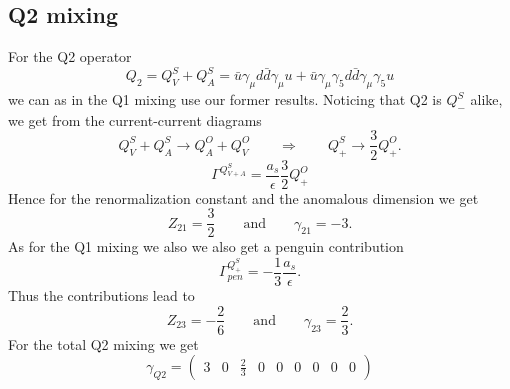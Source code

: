 	\subsection*{Q2 mixing}
	For the Q2 operator 
	\begin{equation}
		Q_2 = Q^S_V + Q^S_A = \bar u \gamma_\mu d \bar d \gamma_\mu u + \bar u \gamma_\mu \gamma_5 d \bar d \gamma_\mu \gamma_5 u
	\end{equation}
	we can as in the Q1 mixing use our former results. Noticing that Q2 is $Q^S_-$ alike, we get from the current-current diagrams 
	\begin{equation}
		Q^S_V + Q^S_A \rightarrow Q^O_A + Q^O_V \qquad	\Rightarrow \qquad Q^S_+ \rightarrow \frac{3}{2} Q^O_+.
	\end{equation}
	\begin{equation}
		\Gamma^{Q^S_{V+A}} = \frac{a_s}{\epsilon} \frac{3}{2} Q^O_{+} 
	\end{equation}
	Hence for the renormalization constant and the anomalous dimension we get
	\begin{equation}
		Z_{21} = \frac{3}{2} \qquad \text{and} \qquad \gamma_{21} = -3.
	\end{equation}
	As for the Q1 mixing we also we also get a penguin contribution
	\begin{equation}
		\Gamma^{Q^S_+}_{pen} = -\frac{1}{3} \frac{a_s}{\epsilon}.
	\end{equation}
	Thus the contributions lead to 
	\begin{equation}
		Z_{23} = -\frac{2}{6} \qquad \text{and} \qquad \gamma_{23} = \frac{2}{3}.
	\end{equation}
	For the total Q2 mixing we get 
	\begin{equation}
		\gamma_{Q2} = 
		\begin{pmatrix}
			3 & 0 & \frac{2}{3} & 0 & 0 & 0 & 0 & 0 & 0
		\end{pmatrix}
	\end{equation}

